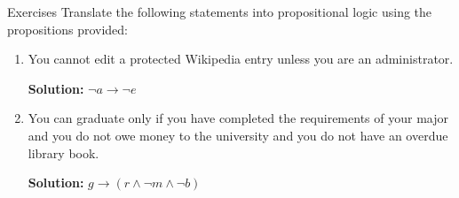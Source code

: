 \documentclass[11pt,t,pdf,xcolor=svgnames,aspectratio=169]{beamer}
\providecommand{\tightlist}{%
  \setlength{\itemsep}{5pt}\setlength{\parskip}{0pt}}
\begin{document}
\begin{frame}{Exercises}
\protect\hypertarget{exercises-3}{}
Translate the following statements into propositional logic using the
propositions provided:

\begin{enumerate}
\tightlist
\item
  \footnotesize You cannot edit a protected Wikipedia entry unless you
  are an administrator.


  \scriptsize

  \textcolor{Roarange}{\textbf{Solution:}}
  \textcolor{Roarange}{$\lnot a \to \lnot e$}
\end{enumerate}

\pause

\begin{enumerate}
\setcounter{enumi}{1}
\tightlist
\item
  \footnotesize You can graduate only if you have completed the
  requirements of your major and you do not owe money to the university
  and you do not have an overdue library book.


  \scriptsize

  \textcolor{Roarange}{\textbf{Solution:}}
  \textcolor{Roarange}{$g \to (r \land \lnot m \land \lnot b)$}
\end{enumerate}
\end{frame}
\end{document}
